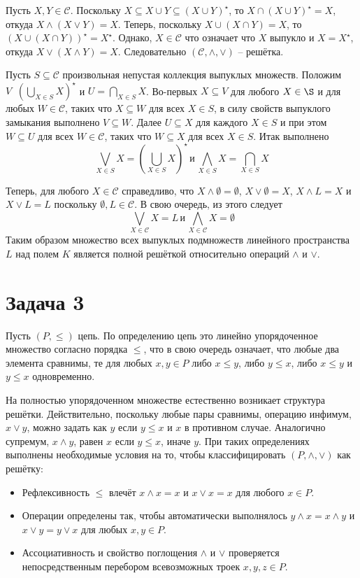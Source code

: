 \documentclass[a4paper]{article}
\newcommand{\brac}[1]{\left ( #1 \right )}
\newcommand{\Ccal}{\mathcal{C}}
\newcommand{\defn}{\mathop{\overset{\Delta}{=}}\nolimits}
\begin{document}
Пусть $X,Y\in \Ccal$. Поскольку $X\subseteq X\cup Y \subseteq \brac{X\cup Y}^\star$, то $X\cap \brac{X\cup Y}^\star = X$, откуда $X\wedge \brac{X\vee Y} = X$. Теперь, поскольку $X\cup \brac{X\cap Y} = X$, то $\brac{X\cup \brac{X\cap Y}}^\star = X^\star$. Однако, $X\in\Ccal$ что означает что $X$ выпукло и $X=X^\star$, откуда $X\vee \brac{X\wedge Y} = X$. Следовательно $\brac{\Ccal, \wedge, \vee}$ -- решётка.

Пусть $S\subseteq \Ccal$ произвольная непустая коллекция выпуклых множеств. Положим $V\defn \brac{\bigcup_{X\in S} X}^\star$ и $U = \bigcap_{X\in S} X$.
Во-первых $X\subseteq V$ для любого $X\in \S$ и для любых $W\in \Ccal$, таких что $X\subseteq W$ для всех $X\in S$, в силу свойств выпуклого замыкания выполнено $V\subseteq W$. Далее $U\subseteq X$ для каждого $X\in S$ и при этом $W\subseteq U$ для всех $W\in \Ccal$, таких что $W\subseteq X$ для всех $X\in S$. Итак выполнено \[\bigvee_{X\in S} X = \brac{\bigcup_{X\in S} X}^\star\,\text{и}\,\bigwedge_{X\in S} X = \bigcap_{X\in S} X\]

Теперь, для любого $X\in\Ccal$ справедливо, что $X\wedge \emptyset = \emptyset$, $X\vee \emptyset = X$, $X\wedge L = X$ и $X\vee L = L$ поскольку $\emptyset, L\in \Ccal$. В свою очередь, из этого следует \[\bigvee_{X\in \Ccal} X = L\,\text{и}\,\bigwedge_{X\in\Ccal} X = \emptyset\] Таким образом множество всех выпуклых подмножеств линейного пространства $L$ над полем $K$ является полной решёткой относительно операций $\wedge$ и $\vee$.


\section{Задача 3} %
\label{sec:task_3}

Пусть $\brac{P, \leq}$ цепь. По определению цепь это линейно упорядоченное множество согласно порядка $\leq$, что в свою очередь означает, что любые два элемента сравнимы, те для любых $x,y\in P$ либо $x\leq y$, либо $y\leq x$, либо $x\leq y$ и $y\leq x$ одновременно.

На полностью упорядоченном множестве естественно возникает структура решётки. Действительно, поскольку любые пары сравнимы, операцию инфимум, $x\vee y$, можно задать как $y$ если $y\leq x$ и $x$ в противном случае. Аналогично супремум, $x\wedge y$, равен $x$ если $y\leq x$, иначе $y$. При таких определениях выполнены необходимые условия на то, чтобы классифицировать $\brac{P, \wedge, \vee}$ как решётку:
\begin{itemize}
	\item Рефлексивность $\leq$ влечёт $x\wedge x = x$ и $x\vee x = x$ для любого $x\in P$.
	\item Операции определены так, чтобы автоматически выполнялось $y\wedge x = x\wedge y$ и $x\vee y = y\vee x$ для любых $x,y\in P$.
	\item Ассоциативность и свойство поглощения $\wedge$ и $\vee$ проверяется непосредственным перебором всевозможных троек $x,y,z\in P$.
\end{itemize}
\end{document}
